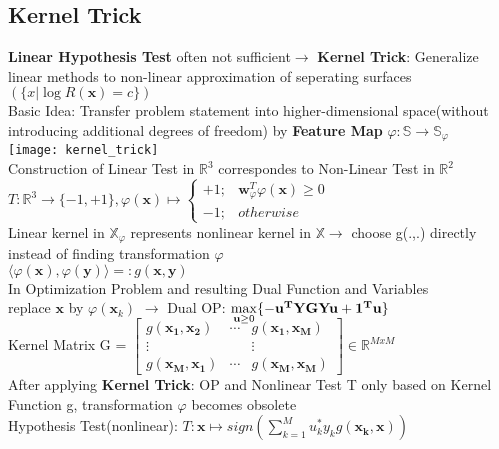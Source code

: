 \begin{sectionbox}
	\subsection{Kernel Trick}
	\textbf{Linear Hypothesis Test} often not sufficient$\rightarrow$ \textbf{Kernel Trick}: Generalize linear methods to non-linear approximation of seperating surfaces $(\{x|\log R(\mathbf{x})=c\})$ \\
	Basic Idea: Transfer problem statement into higher-dimensional space(without introducing additional degrees of freedom) by \textbf{Feature Map} $\varphi: \mathbb{S}\rightarrow\mathbb{S}_{\varphi}$
	\\ 
 \texttt{[image: kernel\_trick]} \\
 Construction of Linear Test in $\mathbb{R}^3$ correspondes to Non-Linear Test in $\mathbb{R}^2$\\
 $\boxed{T:\mathbb{R}^3\rightarrow\{-1,+1\},\varphi(\mathbf{x})\mapsto \begin{cases} +1 ;&\mathbf{w}_{\varphi}^T\varphi(\mathbf{x})\geq0\\
 -1;&otherwise \end{cases}}$ \\
	Linear kernel in $\mathbb{X}_\varphi$ represents nonlinear kernel in $\mathbb{X} \rightarrow$ choose g(.,.) directly instead of finding transformation $\varphi$  \\
	$\boxed{\langle\varphi(\mathbf{x}),\varphi(\mathbf{y})\rangle=:g(\mathbf{x,y})}$ \\

	In Optimization Problem and resulting Dual Function and Variables \\replace $\mathbf{x}$ by $\varphi(\mathbf{x}_k)$ $\rightarrow$ Dual OP: $\smash{\displaystyle\max_{\mathbf{u}\geq0}}\{-\mathbf{u^TYGYu +1^Tu}\}\\$ \\
	Kernel Matrix G = $\begin{bmatrix}
		g(\mathbf{x_1,x_2}) &\cdots& g(\mathbf{x_1,x_M}) \\
		\vdots&&\vdots \\
		g(\mathbf{x_M,x_1}) &\cdots& g(\mathbf{x_M,x_M}) 
	\end{bmatrix} \in \mathbb{R}^{MxM}$ \\
	After applying \textbf{Kernel Trick}: OP and Nonlinear Test T only based on Kernel Function g, transformation $\varphi$ becomes obsolete\\
	Hypothesis Test(nonlinear): $\boxed{T:\mathbf{x}\mapsto sign(\sum_{k=1}^{M}u_k^*y_kg(\mathbf{x_k,x}))}$\\

\end{sectionbox}
